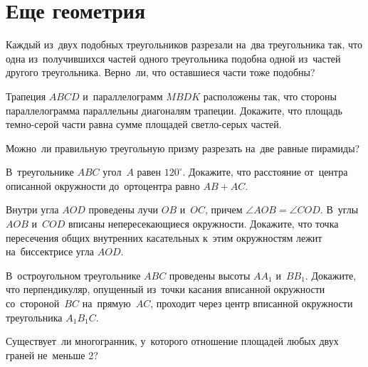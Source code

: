 
\section*{Еще геометрия}

\begin{problems}

\item
Каждый из~двух подобных треугольников разрезали на~два треугольника так, что
одна из~получившихся частей одного треугольника подобна одной из~частей другого
треугольника.
Верно~ли, что оставшиеся части тоже подобны?

\item
Трапеция $ABCD$ и~параллелограмм $MBDK$ расположены так, что стороны
параллелограмма параллельны диагоналям трапеции.
Докажите, что площадь темно-серой части равна сумме площадей светло-серых
частей.
\begin{center}
\end{center}

\item
Можно~ли правильную треугольную призму разрезать на~две равные пирамиды?

\item
В~треугольнике $ABC$ угол~$A$ равен $120^{\circ}$.
Докажите, что расстояние от~центра описанной окружности до~ортоцентра равно
$AB + AC$.

\item
Внутри угла $AOD$ проведены лучи $OB$ и~$OC$, причем
$\angle AOB = \angle COD$.
В~углы $AOB$ и~$COD$ вписаны непересекающиеся окружности.
Докажите, что точка пересечения общих внутренних касательных к~этим окружностям
лежит на~биссектрисе угла $AOD$.

\item
В~остроугольном треугольнике $ABC$ проведены высоты $A A_1$ и~$B B_1$.
Докажите, что перпендикуляр, опущенный из~точки касания вписанной окружности
со~стороной~$BC$ на~прямую~$AC$, проходит через центр вписанной окружности
треугольника $A_1 B_1 C$.

\item
Существует~ли многогранник, у~которого отношение площадей любых двух граней
не~меньше 2?

\end{problems}

